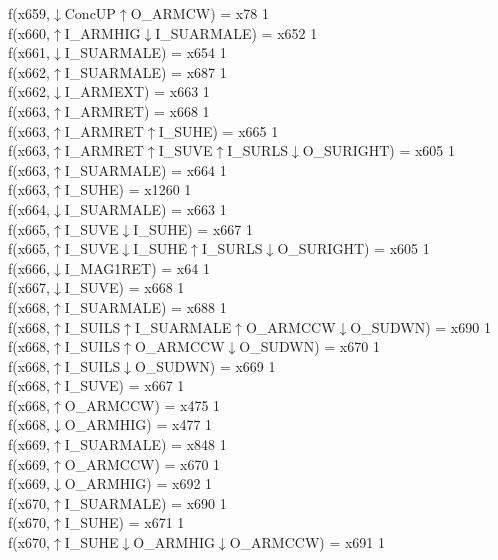 f(x659,$\downarrow$ConcUP$\uparrow$O\_ARMCW) = x78 {1} \\
f(x660,$\uparrow$I\_ARMHIG$\downarrow$I\_SUARMALE) = x652 {1} \\
f(x661,$\downarrow$I\_SUARMALE) = x654 {1} \\
f(x662,$\uparrow$I\_SUARMALE) = x687 {1} \\
f(x662,$\downarrow$I\_ARMEXT) = x663 {1} \\
f(x663,$\uparrow$I\_ARMRET) = x668 {1} \\
f(x663,$\uparrow$I\_ARMRET$\uparrow$I\_SUHE) = x665 {1} \\
f(x663,$\uparrow$I\_ARMRET$\uparrow$I\_SUVE$\uparrow$I\_SURLS$\downarrow$O\_SURIGHT) = x605 {1} \\
f(x663,$\uparrow$I\_SUARMALE) = x664 {1} \\
f(x663,$\uparrow$I\_SUHE) = x1260 {1} \\
f(x664,$\downarrow$I\_SUARMALE) = x663 {1} \\
f(x665,$\uparrow$I\_SUVE$\downarrow$I\_SUHE) = x667 {1} \\
f(x665,$\uparrow$I\_SUVE$\downarrow$I\_SUHE$\uparrow$I\_SURLS$\downarrow$O\_SURIGHT) = x605 {1} \\
f(x666,$\downarrow$I\_MAG1RET) = x64 {1} \\
f(x667,$\downarrow$I\_SUVE) = x668 {1} \\
f(x668,$\uparrow$I\_SUARMALE) = x688 {1} \\
f(x668,$\uparrow$I\_SUILS$\uparrow$I\_SUARMALE$\uparrow$O\_ARMCCW$\downarrow$O\_SUDWN) = x690 {1} \\
f(x668,$\uparrow$I\_SUILS$\uparrow$O\_ARMCCW$\downarrow$O\_SUDWN) = x670 {1} \\
f(x668,$\uparrow$I\_SUILS$\downarrow$O\_SUDWN) = x669 {1} \\
f(x668,$\uparrow$I\_SUVE) = x667 {1} \\
f(x668,$\uparrow$O\_ARMCCW) = x475 {1} \\
f(x668,$\downarrow$O\_ARMHIG) = x477 {1} \\
f(x669,$\uparrow$I\_SUARMALE) = x848 {1} \\
f(x669,$\uparrow$O\_ARMCCW) = x670 {1} \\
f(x669,$\downarrow$O\_ARMHIG) = x692 {1} \\
f(x670,$\uparrow$I\_SUARMALE) = x690 {1} \\
f(x670,$\uparrow$I\_SUHE) = x671 {1} \\
f(x670,$\uparrow$I\_SUHE$\downarrow$O\_ARMHIG$\downarrow$O\_ARMCCW) = x691 {1} \\
